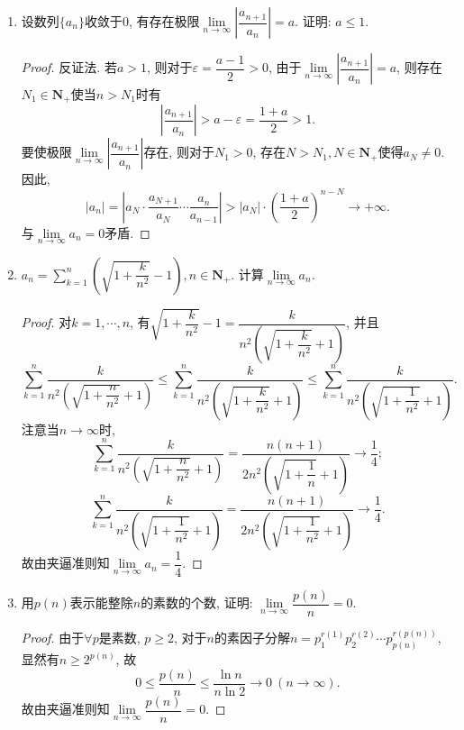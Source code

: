 \documentclass[a4paper,11pt,twoside]{ctexbook}
\begin{document}
\begin{enumerate}
	\item 设数列$\{a_n\}$收敛于$0$, 有存在极限$\lim\limits_{n\to\infty} \left|\dfrac{a_{n+1}}{a_n}\right|=a$. 证明: $a\leqslant 1$.
	      \begin{proof}
		      反证法. 若$a>1$, 则对于$\varepsilon=\dfrac{a-1}{2}>0$, 由于$\lim\limits_{n\to\infty} \left|\dfrac{a_{n+1}}{a_n}\right|=a$, 则存在$N_1\in\mathbf{N}_{+}$使当$n>N_1$时有
		      \[
			      \left|\dfrac{a_{n+1}}{a_n}\right|>a-\varepsilon=\dfrac{1+a}{2}>1.
		      \]
		      要使极限$\lim\limits_{n\to\infty} \left|\dfrac{a_{n+1}}{a_n}\right|$存在, 则对于$N_1>0$, 存在$N>N_1, N\in\mathbf{N}_{+}$使得$a_{N}\neq 0$. 因此,
		      \[
			      |a_n|=\left|a_N\cdot\dfrac{a_{N+1}}{a_{N}}\cdots\dfrac{a_n}{a_{n-1}}\right|>|a_N|\cdot\left(\dfrac{1+a}{2}\right)^{n-N}\to+\infty.
		      \]
		      与$\lim\limits_{n\to\infty} a_n=0$矛盾. \qedhere
	      \end{proof}

	\item $a_n=\displaystyle\sum\limits_{k=1}^n\left(\sqrt{1+\dfrac{k}{n^2}}-1\right), n\in\mathbf{N}_{+}$. 计算$\lim\limits_{n\to\infty} a_n$.
	      \begin{proof}
		      对$k=1,\cdots, n$, 有$\sqrt{1+\dfrac{k}{n^2}}-1=\dfrac{k}{n^2\left(\sqrt{1+\dfrac{k}{n^2}}+1\right)}$, 并且
		      \[
			      \sum_{k=1}^{n} \dfrac{k}{n^2\left(\sqrt{1+\dfrac{n}{n^2}}+1\right)}\leqslant \sum_{k=1}^{n} \dfrac{k}{n^2\left(\sqrt{1+\dfrac{k}{n^2}}+1\right)}\leqslant \sum_{k=1}^{n} \dfrac{k}{n^2\left(\sqrt{1+\dfrac{1}{n^2}}+1\right)}.
		      \]
		      注意当$n\to\infty$时,
		      \[
			      \sum_{k=1}^{n} \dfrac{k}{n^2\left(\sqrt{1+\dfrac{n}{n^2}}+1\right)}=\dfrac{n(n+1)}{2n^2\left(\sqrt{1+\dfrac{1}{n}}+1\right)}\to\dfrac{1}{4};
		      \]
		      \[
			      \sum_{k=1}^{n} \dfrac{k}{n^2\left(\sqrt{1+\dfrac{1}{n^2}}+1\right)}=\dfrac{n(n+1)}{2n^2\left(\sqrt{1+\dfrac{1}{n^2}}+1\right)}\to\dfrac{1}{4}.
		      \]
		      故由夹逼准则知$\lim\limits_{n\to\infty} a_n=\dfrac{1}{4}$. \qedhere
	      \end{proof}

	\item 用$p(n)$表示能整除$n$的素数的个数, 证明: $\lim\limits_{n\to\infty} \dfrac{p(n)}{n}=0$.
	      \begin{proof}
		      由于$\forall p$是素数, $p\geqslant 2$, 对于$n$的素因子分解$n=p_1^{r(1)}p_2^{r(2)}\cdots p_{p(n)}^{r(p(n))}$, 显然有$n\geqslant 2^{p(n)}$, 故
		      \[
			      0\leqslant\dfrac{p(n)}{n}\leqslant\dfrac{\ln{n}}{n\ln{2}}\to 0\ (n\to\infty).
		      \]
		      故由夹逼准则知$\lim\limits_{n\to\infty} \dfrac{p(n)}{n}=0$.\qedhere
	      \end{proof}


\end{enumerate}
\end{document}
